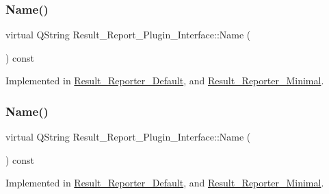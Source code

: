 \subsubsection{\texorpdfstring{Name()}{Name()}\hspace{0.1cm}{\footnotesize\ttfamily [1/3]}}
{\footnotesize\ttfamily virtual Q\+String Result\+\_\+\+Report\+\_\+\+Plugin\+\_\+\+Interface\+::\+Name (\begin{DoxyParamCaption}{ }\end{DoxyParamCaption}) const\hspace{0.3cm}{\ttfamily [pure virtual]}}



Implemented in \hyperlink{classResult__Reporter__Default_af1794a748e246ed0113e85e1f25e2907}{Result\+\_\+\+Reporter\+\_\+\+Default}, and \hyperlink{classResult__Reporter__Minimal_ae6bd38556e2b7b724ab077574665aae5}{Result\+\_\+\+Reporter\+\_\+\+Minimal}.

\mbox{\label{classResult__Report__Plugin__Interface_ad86b327f9bebee3f52666abeea1ca03f}} 
\subsubsection{\texorpdfstring{Name()}{Name()}\hspace{0.1cm}{\footnotesize\ttfamily [2/3]}}
{\footnotesize\ttfamily virtual Q\+String Result\+\_\+\+Report\+\_\+\+Plugin\+\_\+\+Interface\+::\+Name (\begin{DoxyParamCaption}{ }\end{DoxyParamCaption}) const\hspace{0.3cm}{\ttfamily [pure virtual]}}



Implemented in \hyperlink{classResult__Reporter__Default_af1794a748e246ed0113e85e1f25e2907}{Result\+\_\+\+Reporter\+\_\+\+Default}, and \hyperlink{classResult__Reporter__Minimal_ae6bd38556e2b7b724ab077574665aae5}{Result\+\_\+\+Reporter\+\_\+\+Minimal}.

